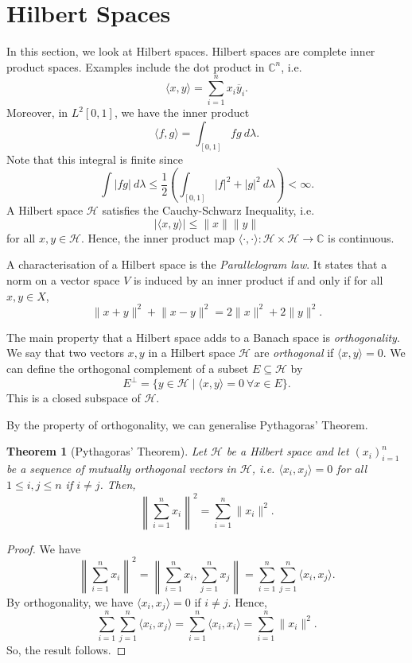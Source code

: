 \documentclass[a4paper, openany]{memoir}
\theoremstyle{definition}
\theoremstyle{plain}
\newtheorem{theorem}[definition]{Theorem}
\begin{document}
    \section{Hilbert Spaces}
    In this section, we look at Hilbert spaces. Hilbert spaces are complete inner product spaces. Examples include the dot product in $\mathbb{C}^n$, i.e.
    \[\langle x, y \rangle = \sum_{i=1}^n x_i \overline{y}_i.\]
    Moreover, in $L^2[0, 1]$, we have the inner product
    \[\langle f, g \rangle = \int_{[0, 1]} fg \ d\lambda.\]
    Note that this integral is finite since
    \[\int |fg| \ d\lambda \leq \frac{1}{2} \left(\int_{[0, 1]} |f|^2 + |g|^2 \ d\lambda\right) < \infty.\]
    A Hilbert space $\mathcal{H}$ satisfies the Cauchy-Schwarz Inequality, i.e. 
    \[|\langle x, y \rangle| \leq \lVert x \rVert \lVert y \rVert\]
    for all $x, y \in \mathcal{H}$. Hence, the inner product map $\langle \cdot, \cdot \rangle \colon \mathcal{H} \times \mathcal{H} \to \mathbb{C}$ is continuous.

    A characterisation of a Hilbert space is the \emph{Parallelogram law}. It states that a norm on a vector space $V$ is induced by an inner product if and only if for all $x, y \in X$,
    \[\lVert x + y \rVert^2 + \lVert x - y \rVert^2 = 2\lVert x \rVert^2 + 2\lVert y \rVert^2.\]

    The main property that a Hilbert space adds to a Banach space is \emph{orthogonality}. We say that two vectors $x, y$ in a Hilbert space $\mathcal{H}$ are \emph{orthogonal} if $\langle x, y \rangle = 0$. We can define the orthogonal complement of a subset $E \subseteq \mathcal{H}$ by
    \[E^\perp = \{y \in \mathcal{H} \mid \langle x, y \rangle = 0 \ \forall x \in E\}.\]
    This is a closed subspace of $\mathcal{H}$.

    By the property of orthogonality, we can generalise Pythagoras' Theorem.
    \begin{theorem}[Pythagoras' Theorem]
        Let $\mathcal{H}$ be a Hilbert space and let $(x_i)_{i=1}^n$ be a sequence of mutually orthogonal vectors in $\mathcal{H}$, i.e. $\langle x_i, x_j \rangle = 0$ for all $1 \leq i, j \leq n$ if $i \neq j$. Then,
        \[\left \lVert \sum_{i=1}^n x_i \right \rVert^2 = \sum_{i=1}^{n} \lVert x_i \rVert^2.\]
    \end{theorem}
    \begin{proof}
        We have 
        \[\left\lVert \sum_{i=1}^n x_i \right\rVert^2 = \left\lVert \sum_{i=1}^n x_i, \sum_{j=1}^n x_j \right\rVert = \sum_{i=1}^n \sum_{j=1}^n \langle x_i, x_j \rangle.\]
        By orthogonality, we have $\langle x_i, x_j \rangle = 0$ if $i \neq j$. Hence,
        \[\sum_{i=1}^n \sum_{j=1}^n \langle x_i, x_j \rangle = \sum_{i=1}^n \langle x_i, x_i \rangle = \sum_{i=1}^n \lVert x_i \rVert^2.\]
        So, the result follows.
    \end{proof}
\end{document}
